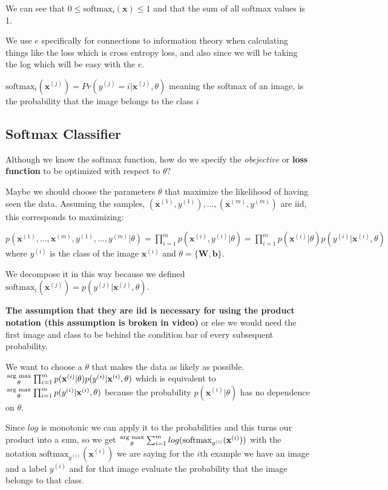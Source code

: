 \documentclass[twocolumn, letter, 10pt, landscape]{article}
\newcommand{\mb}{\mathbf}
\newcommand{\tb}{\textbf}
\newcommand{\ti}{\textit}
\begin{document}
We can see that $0\le \text{softmax}_i(\mb{x})\le 1$ and that the sum of all softmax values is 1.

We use $e$ specifically for connections to information theory when calculating things like the loss which is cross entropy loss, and also since we will be taking the log which will be easy with the $e$.

$\text{softmax}_i(\mb{x}^{(j)}) = Pr(y^{(j)}=i|\mb{x}^{(j)},\theta)$ meaning the softmax of an image, is the probability that the image belongs to the class $i$

\subsection{Softmax Classifier}
Although we know the softmax function, how do we specify the \ti{obejective} or \tb{loss function} to be optimized with respect to $\theta$?

Maybe we should choose the parameters $\theta$ that maximize the likelihood of having seen the data. Assuming the samples, $(\mb{x}^{(1)}, y^{(1)}),...,(\mb{x}^{(m)}, y^{(m)})$ are iid, this corresponds to maximizing:

$p(\mb{x}^{(1)},...,\mb{x}^{(m)},y^{(1)},...,y^{(m)}|\theta) = \prod_{i=1}^mp(\mb{x}^{(i)},y^{(i)}|\theta) = \prod_{i=1}^mp(\mb{x}^{(i)}|\theta)p(y^{(i)}|\mb{x}^{(i)},\theta)$ where $y^{(i)}$ is the class of the image $\mb{x}^{(i)}$ and $\theta = \{\mb{W}, \mb{b}\}$. 

We decompose it in this way because we defined $\text{softmax}_i(\mb{x}^{(j)}) = p(y^{(j)}|\mb{x}^{(j)},\theta)$.

\tb{The assumption that they are iid is necessary for using the product notation (this assumption is broken in video)} or else we would need the first image and class to be behind the condition bar of every subsequent probability.

We want to choose a $\theta$ that makes the data as likely as possible. ${\text{arg max} \atop \theta} \prod_{i=1}^mp(\mb{x}^{(i)}|\theta)p(y^{(i)}|\mb{x}^{(i)},\theta)$ which is equivalent to ${\text{arg max} \atop \theta} \prod_{i=1}^mp(y^{(i)}|\mb{x}^{(i)},\theta)$ because the probability $p(\mb{x}^{(i)}|\theta)$ has no dependence on $\theta$.

Since $log$ is monotonic we can apply it to the probabilities and this turns our product into a sum, so we get ${\text{arg max}\atop \theta}\sum_{i=1}^m log(\text{softmax}_{y^{(i)}}(\mb{x}^{(i)}))$ with the notation $\text{softmax}_{y^{(i)}}(\mb{x}^{(i)})$ we are saying for the $i$th example we have an image and a label $y^{(i)}$ and for that image evaluate the probability that the image belongs to that class.
\end{document}
